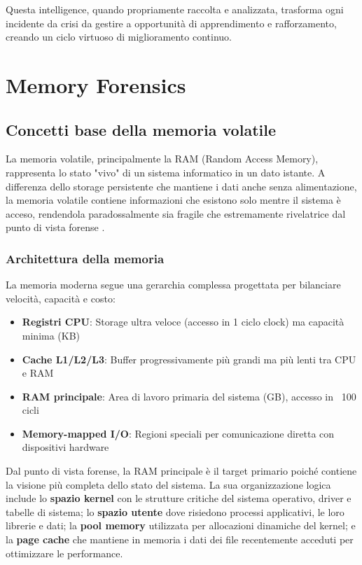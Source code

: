 Questa intelligence, quando propriamente raccolta e analizzata, trasforma ogni incidente da crisi da gestire a opportunità di apprendimento e rafforzamento, creando un ciclo virtuoso di miglioramento continuo.

\section{Memory Forensics}

\subsection{Concetti base della memoria volatile}

La memoria volatile, principalmente la RAM (Random Access Memory), rappresenta lo stato "vivo" di un sistema informatico in un dato istante. A differenza dello storage persistente che mantiene i dati anche senza alimentazione, la memoria volatile contiene informazioni che esistono solo mentre il sistema è acceso, rendendola paradossalmente sia fragile che estremamente rivelatrice dal punto di vista forense \cite{ligh2014}.

\subsubsection{Architettura della memoria}
La memoria moderna segue una gerarchia complessa progettata per bilanciare velocità, capacità e costo:

\begin{itemize}
    \item \textbf{Registri CPU}: Storage ultra veloce (accesso in 1 ciclo clock) ma capacità minima (KB)
    \item \textbf{Cache L1/L2/L3}: Buffer progressivamente più grandi ma più lenti tra CPU e RAM
    \item \textbf{RAM principale}: Area di lavoro primaria del sistema (GB), accesso in ~100 cicli
    \item \textbf{Memory-mapped I/O}: Regioni speciali per comunicazione diretta con dispositivi hardware
\end{itemize}

Dal punto di vista forense, la RAM principale è il target primario poiché contiene la visione più completa dello stato del sistema. La sua organizzazione logica include lo \textbf{spazio kernel} con le strutture critiche del sistema operativo, driver e tabelle di sistema; lo \textbf{spazio utente} dove risiedono processi applicativi, le loro librerie e dati; la \textbf{pool memory} utilizzata per allocazioni dinamiche del kernel; e la \textbf{page cache} che mantiene in memoria i dati dei file recentemente acceduti per ottimizzare le performance.

